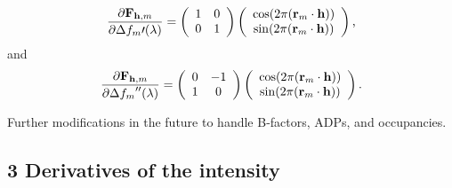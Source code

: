 \documentclass[12pt, letterpaper]{article}
\begin{document}
  \begin{equation}
   \dfrac{\partial\mathbf{F}_{\mathbf{h},m}} {\partial\Delta{f_m}\prime(\lambda)} = 
    \left(\begin{array} {c c} 
    1   & 0 \\
     0& 1 
    \end{array}\right)
    \left(
    \begin{array}{c}
    \cos(2\pi(\mathbf{r}_m\cdot\mathbf{h})) \\
    \sin(2\pi(\mathbf{r}_m\cdot\mathbf{h}))
    \end{array}\right)
    \text{,}
     \label{eqn:qthx}
  \end{equation}
and
\begin{equation}
   \dfrac{\partial\mathbf{F}_{\mathbf{h},m}} {\partial\Delta{{f_m}''}(\lambda)} =  
    \left(\begin{array} {c c} 
    0  & 
   -1 \\
     1 & 0
    \end{array}\right)
    \left(
    \begin{array}{c}
    \cos(2\pi(\mathbf{r}_m\cdot\mathbf{h})) \\
    \sin(2\pi(\mathbf{r}_m\cdot\mathbf{h}))
    \end{array}\right)
    \text{.}
    \label{eqn:qthy}
  \end{equation}

 Further modifications in the future to handle B-factors, ADPs, and occupancies.
  
 \subsection*{3 Derivatives of the intensity}
 
\end{document}
